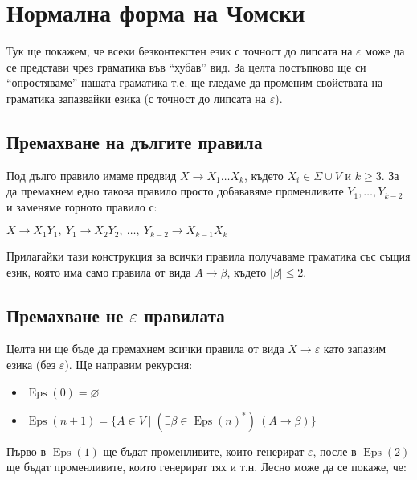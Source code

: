 \section{Нормална форма на Чомски}

Тук ще покажем, че всеки безконтекстен език с точност до липсата на $\varepsilon$ може да се представи чрез граматика във ``хубав'' вид.
За целта постъпково ще си ``опростяваме'' нашата граматика т.е. ще гледаме да променим свойствата на граматика запазвайки езика (с точност до липсата на $\varepsilon$).

\subsection*{Премахване на дългите правила}

Под дълго правило имаме предвид $X \rightarrow X_1 \dots X_k$, където $X_i \in \Sigma \cup V$ и $k \geq 3$.
За да премахнем едно такова правило просто добававяме променливите $Y_1, \dots, Y_{k - 2}$ и заменяме горното правило с:

\begin{center}
    $X \rightarrow X_1 Y_1, \: Y_1 \rightarrow X_2 Y_2, \: \dots, \: Y_{k - 2} \rightarrow X_{k - 1} X_k$

\end{center}
Прилагайки тази конструкция за всички правила получаваме граматика със същия език, която има само правила от вида $A \rightarrow \beta$, където $|\beta| \leq 2$.

\subsection*{Премахване не $\varepsilon$ правилата}

Целта ни ще бъде да премахнем всички правила от вида $X \rightarrow \varepsilon$ като запазим езика (без $\varepsilon$).
Ще направим рекурсия:

\begin{itemize}
    \item $\operatorname{Eps}(0) = \varnothing$
    \item $\operatorname{Eps}(n+1) = \{ A \in V \mid (\exists \beta \in \operatorname{Eps}(n)^*) \: (A \rightarrow \beta) \}$

\end{itemize}

Първо в $\operatorname{Eps}(1)$ ще бъдат променливите, които генерират $\varepsilon$, после в $\operatorname{Eps}(2)$ ще бъдат променливите, които генерират тях и т.н.
Лесно може да се покаже, че:

